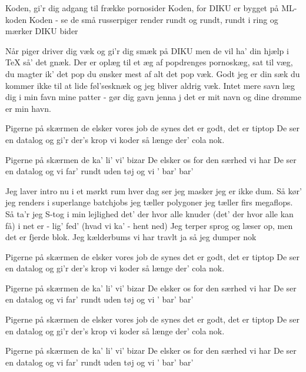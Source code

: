 \documentclass[a4paper,11pt]{article}
\begin{document}
\begin{song}
Koden, gi'r dig adgang til frække pornosider
Koden, for DIKU er bygget på ML-koden
Koden - se de små russerpiger render rundt og rundt, rundt i ring og mærker DIKU bider


Når piger driver dig væk
og gi'r dig smæk
på DIKU men de vil ha' din hjælp i TeX
så' det gnæk.
Der er oplæg
til et æg
af popdrenges pornoskæg,
sat til væg,
du magter ik' det pop
du ønsker mest af alt det pop væk.
Godt jeg er din sæk
du kommer ikke til at lide føl'sesknæk
og jeg bliver aldrig væk.
Intet mere savn
læg dig i min favn
mine patter - gør dig gavn
jenna j det er mit navn
og dine drømme er min havn.


Pigerne på skærmen de elsker vores job
de synes det er godt, det er tiptop
De ser en datalog og gi'r der's krop
vi koder så længe der' cola nok.

Pigerne på skærmen de ka' li' vi' bizar
De elsker os for den særhed vi har
De ser en datalog og vi far'
rundt uden tøj og vi ' bar' bar'


Jeg laver intro nu
i et mørkt rum
hver dag ser jeg masker 
jeg er ikke dum.
Så kør' jeg renders i superlange batchjobs
jeg tæller polygoner
jeg tæller firs megaflops.
Så ta'r jeg S-tog
i min lejlighed
det' der hvor alle knuder          (det' der hvor alle kan få)
i net er - lig' fed'               (hvad vi ka' - hent ned)
Jeg terper sprog og læser op,
men det er fjerde blok.
Jeg kælderbums
vi har travlt ja så jeg dumper nok


Pigerne på skærmen de elsker vores job
de synes det er godt, det er tiptop
De ser en datalog og gi'r der's krop
vi koder så længe der' cola nok.

Pigerne på skærmen de ka' li' vi' bizar
De elsker os for den særhed vi har
De ser en datalog og vi far'
rundt uden tøj og vi ' bar' bar'


Pigerne på skærmen de elsker vores job
de synes det er godt, det er tiptop
De ser en datalog og gi'r der's krop
vi koder så længe der' cola nok.

Pigerne på skærmen de ka' li' vi' bizar
De elsker os for den særhed vi har
De ser en datalog og vi far'
rundt uden tøj og vi ' bar' bar'



\end{song}
\end{document}
